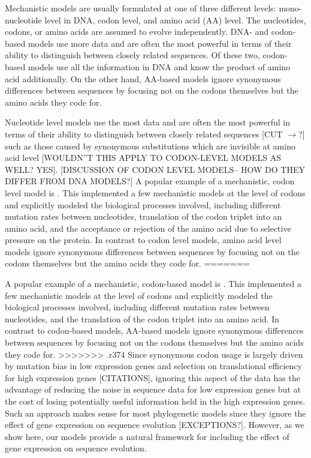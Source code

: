 \documentclass[13pt]{article}
\begin{document}
Mechanistic models are usually formulated at one of three different levels: mono-nucleotide level in DNA, codon level, and amino acid (AA) level.
The nucleotides, codons, or amino acids are assumed to evolve independently.
DNA- and codon-based models use more data and are often the most powerful in terms of their ability to distinguish between closely related sequences. 
Of these two, codon-based models use all the information in DNA and know the product of amino acid additionally. 
On the other hand, AA-based models ignore synonymous differences between sequences by focusing not on the codons themselves but the amino acids they code for. 

Nucleotide level models use the most data and are often the most powerful in terms of their ability to distinguish between closely related sequences [CUT $\rightarrow$?] such as those caused by synonymous substitutions which are invisible at amino acid level [WOULDN''T THIS APPLY TO CODON-LEVEL MODELS AS WELL? YES].
[DISCUSSION OF CODON LEVEL MODELS-- HOW DO THEY DIFFER FROM DNA MODELS?]
A popular example of a mechanistic, codon level model is \cite{YangEtAl98}.
This implemented a few mechanistic models at the level of codons and explicitly modeled the biological processes involved, including different mutation rates between nucleotides, translation of the codon triplet into an amino acid, and the acceptance or rejection of the amino acid due to selective pressure on the protein. 
In contrast to codon level models, amino acid level models ignore synonymous differences between sequences by focusing not on the codons themselves but the amino acids they code for.
=======


A popular example of a mechanistic, codon-based model is \cite{YangEtAl98}.
This implemented a few mechanistic models at the level of codons and explicitly modeled the biological processes involved, including different mutation rates between nucleotides, and the translation of the codon triplet into an amino acid. 
In contrast to codon-based models, AA-based models ignore synonymous differences between sequences by focusing not on the codons themselves but the amino acids they code for.
>>>>>>> .r374
Since synonymous codon usage is largely driven by mutation bias in low expression genes and selection on translational efficiency for high expression genes [CITATIONS], ignoring this aspect of the data has the advantage of reducing the noise in sequence data for low expression genes but at the cost of losing potentially useful information held in the high expression genes.
Such an approach makes sense for most phylogenetic models since they ignore the effect of gene expression on sequence evolution [EXCEPTIONS?].
However, as we show here, our models provide a natural framework for including the effect of gene expression on sequence evolution.
\end{document}
